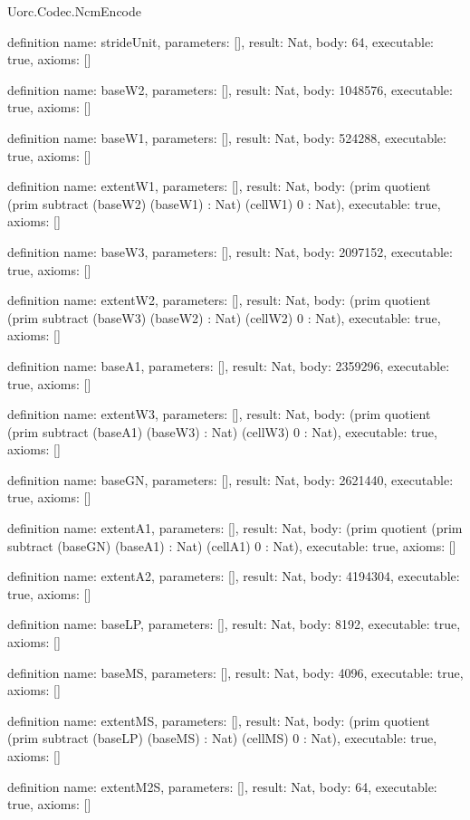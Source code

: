 \begin{lexlean}{Uorc.Codec.NcmEncode}
\begin{semanticmodule}
definition{
  name: strideUnit,
  parameters: [],
  result: Nat,
  body: 64,
  executable: true,
  axioms: []
}

definition{
  name: baseW2,
  parameters: [],
  result: Nat,
  body: 1048576,
  executable: true,
  axioms: []
}

definition{
  name: baseW1,
  parameters: [],
  result: Nat,
  body: 524288,
  executable: true,
  axioms: []
}

definition{
  name: extentW1,
  parameters: [],
  result: Nat,
  body: (prim quotient (prim subtract (baseW2) (baseW1) : Nat) (cellW1) 0 : Nat),
  executable: true,
  axioms: []
}

definition{
  name: baseW3,
  parameters: [],
  result: Nat,
  body: 2097152,
  executable: true,
  axioms: []
}

definition{
  name: extentW2,
  parameters: [],
  result: Nat,
  body: (prim quotient (prim subtract (baseW3) (baseW2) : Nat) (cellW2) 0 : Nat),
  executable: true,
  axioms: []
}

definition{
  name: baseA1,
  parameters: [],
  result: Nat,
  body: 2359296,
  executable: true,
  axioms: []
}

definition{
  name: extentW3,
  parameters: [],
  result: Nat,
  body: (prim quotient (prim subtract (baseA1) (baseW3) : Nat) (cellW3) 0 : Nat),
  executable: true,
  axioms: []
}

definition{
  name: baseGN,
  parameters: [],
  result: Nat,
  body: 2621440,
  executable: true,
  axioms: []
}

definition{
  name: extentA1,
  parameters: [],
  result: Nat,
  body: (prim quotient (prim subtract (baseGN) (baseA1) : Nat) (cellA1) 0 : Nat),
  executable: true,
  axioms: []
}

definition{
  name: extentA2,
  parameters: [],
  result: Nat,
  body: 4194304,
  executable: true,
  axioms: []
}

definition{
  name: baseLP,
  parameters: [],
  result: Nat,
  body: 8192,
  executable: true,
  axioms: []
}

definition{
  name: baseMS,
  parameters: [],
  result: Nat,
  body: 4096,
  executable: true,
  axioms: []
}

definition{
  name: extentMS,
  parameters: [],
  result: Nat,
  body: (prim quotient (prim subtract (baseLP) (baseMS) : Nat) (cellMS) 0 : Nat),
  executable: true,
  axioms: []
}

definition{
  name: extentM2S,
  parameters: [],
  result: Nat,
  body: 64,
  executable: true,
  axioms: []
}


\end{semanticmodule}
\end{lexlean}
